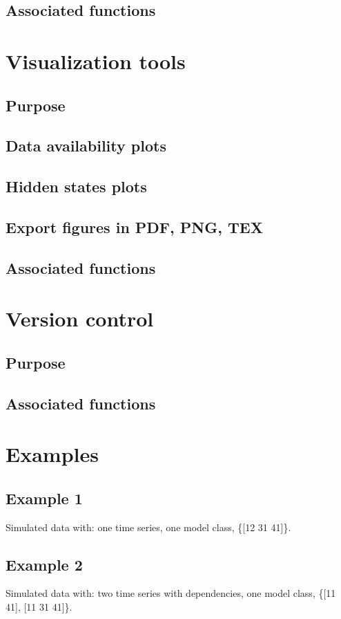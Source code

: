 \documentclass{book}
\begin{document}
\section{Associated functions}
\newpage

\chapter{Visualization tools}
\section{Purpose}
\section{Data availability plots}
\section{Hidden states plots}
\section{Export figures in PDF, PNG, TEX}
\section{Associated functions}
\newpage


\chapter{Version control}
\section{Purpose}
\section{Associated functions}
\newpage

\chapter{Examples}
\section{Example 1}
Simulated data with: one time series, one model class, \{[12 31 41]\}.

\section{Example 2}
Simulated data with: two time series with dependencies, one model class, \{[11 41], [11 31 41]\}.
\end{document}
